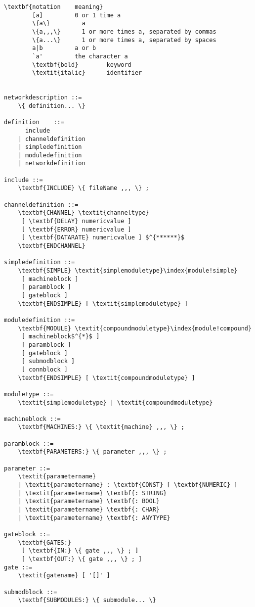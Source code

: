 \begin{Verbatim}[commandchars=\\\{\}]
        \textbf{notation    meaning}
        [a]         0 or 1 time a
        \{a\}         a
        \{a,,,\}      1 or more times a, separated by commas
        \{a...\}      1 or more times a, separated by spaces
        a|b         a or b
        `a'         the character a
        \textbf{bold}        keyword
        \textit{italic}      identifier


networkdescription ::=
    \{ definition... \}

definition    ::=
      include
    | channeldefinition
    | simpledefinition
    | moduledefinition
    | networkdefinition

include ::=
    \textbf{INCLUDE} \{ fileName ,,, \} ;

channeldefinition ::=
    \textbf{CHANNEL} \textit{channeltype} 
     [ \textbf{DELAY} numericvalue ] 
     [ \textbf{ERROR} numericvalue ] 
     [ \textbf{DATARATE} numericvalue ] $^{******}$
    \textbf{ENDCHANNEL}

simpledefinition ::= 
    \textbf{SIMPLE} \textit{simplemoduletype}\index{module!simple}
     [ machineblock ] 
     [ paramblock ]
     [ gateblock ]
    \textbf{ENDSIMPLE} [ \textit{simplemoduletype} ]

moduledefinition ::= 
    \textbf{MODULE} \textit{compoundmoduletype}\index{module!compound}
     [ machineblock$^{*}$ ] 
     [ paramblock ]
     [ gateblock ]
     [ submodblock ]
     [ connblock ]
    \textbf{ENDSIMPLE} [ \textit{compoundmoduletype} ]

moduletype ::=
    \textit{simplemoduletype} | \textit{compoundmoduletype}

machineblock ::= 
    \textbf{MACHINES:} \{ \textit{machine} ,,, \} ;

paramblock ::=
    \textbf{PARAMETERS:} \{ parameter ,,, \} ;

parameter ::=
    \textit{parametername}
    | \textit{parametername} : \textbf{CONST} [ \textbf{NUMERIC} ] 
    | \textit{parametername} \textbf{: STRING} 
    | \textit{parametername} \textbf{: BOOL} 
    | \textit{parametername} \textbf{: CHAR} 
    | \textit{parametername} \textbf{: ANYTYPE}

gateblock ::=
    \textbf{GATES:} 
     [ \textbf{IN:} \{ gate ,,, \} ; ]
     [ \textbf{OUT:} \{ gate ,,, \} ; ]
gate ::=
    \textit{gatename} [ '[]' ]

submodblock ::=
    \textbf{SUBMODULES:} \{ submodule... \}


\end{Verbatim}
